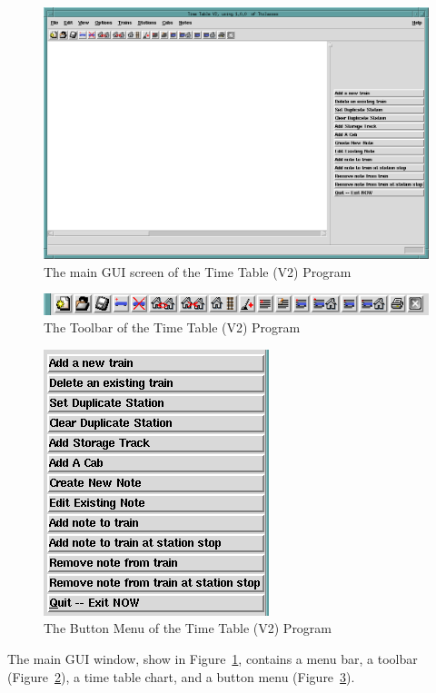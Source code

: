 \begin{figure}[hbpt]
\begin{centering}
\includegraphics[width=5in]{TTMainGUIBlank.png}
\caption{The main GUI screen of the Time Table (V2) Program}
\label{fig:tt:MainGUIBlank}
\end{centering}
\end{figure}
\begin{figure}[hbpt]
\begin{centering}
\includegraphics[width=5in]{TTMainGUIToolBar.png}
\caption{The Toolbar of the Time Table (V2) Program}
\label{fig:tt:MainGUIToolBar}
\end{centering}
\end{figure}
\begin{figure}[hbpt]
\begin{centering}
\includegraphics{TTMainGUIButtonMenu.png}
\caption{The Button Menu of the Time Table (V2) Program}
\label{fig:tt:MainGUIButtonMenu}
\end{centering}
\end{figure}
The main GUI window, show in
Figure~\ref{fig:tt:MainGUIBlank}, contains a menu bar, a toolbar
(Figure~\ref{fig:tt:MainGUIToolBar}), a time table chart, and a button
menu (Figure~\ref{fig:tt:MainGUIButtonMenu}).

